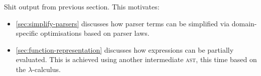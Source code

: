 \documentclass[../../main.tex]{subfiles}
\begin{document}
Shit output from previous section. This motivates:
\begin{itemize}
  \item \cref{sec:simplify-parsers} discusses how parser terms can be simplified via domain-specific optimisations based on parser laws.
  \item \cref{sec:function-representation} discusses how expressions can be partially evaluated. This is achieved using another intermediate \textsc{ast}, this time based on the $\lambda$-calculus.
\end{itemize}




\end{document}
